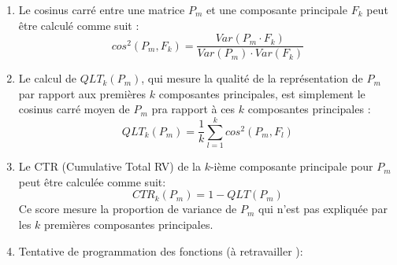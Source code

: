 \documentclass[
]{article}
\begin{document}
\begin{enumerate}
\def\labelenumi{\alph{enumi})}
\item
  Le cosinus carré entre une matrice \(P_m\) et une composante
  principale \(F_k\) peut être calculé comme suit :\\
  \[cos^2(P_m,F_k) = \frac{Var(P_m\cdot F_k)}{Var(P_m)\cdot Var(F_k)}\]
\item
  Le calcul de \(QLT_k(P_m)\), qui mesure la qualité de la
  représentation de \(P_m\) par rapport aux premières \(k\) composantes
  principales, est simplement le cosinus carré moyen de \(P_m\) pra
  rapport à ces \(k\) composantes principales :\\
  \[QLT_k(P_m) = \frac{1}{k} \sum_{l=1}^{k} cos^2(P_m,F_l)\]
\item
  Le CTR (Cumulative Total RV) de la \(k\)-ième composante principale
  pour \(P_m\) peut être calculée comme suit:\\
  \[CTR_k(P_m) = 1-QLT(P_m)\] Ce score mesure la proportion de variance
  de \(P_m\) qui n'est pas expliquée par les \(k\) premières composantes
  principales.
\item
  Tentative de programmation des fonctions (à retravailler ):
\end{enumerate}
\end{document}
